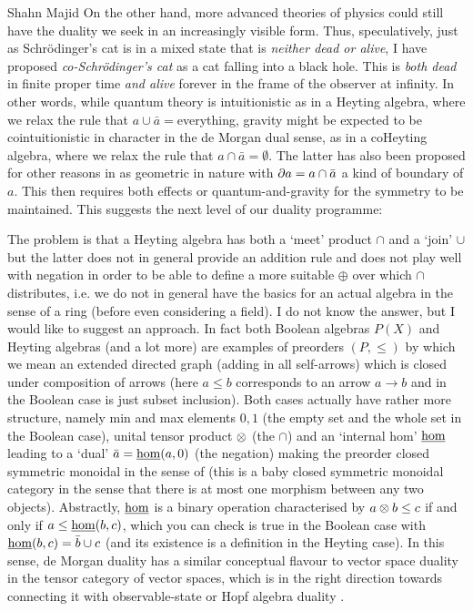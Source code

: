 \begin{artengenv}{Shahn Majid}
On the other hand, more advanced theories of physics could still have the duality we seek in an increasingly visible form. Thus, speculatively, just as Schr\"odinger's cat is in a mixed state that is {\em neither dead or alive}, I have proposed \parencite{Ma:qg3} {\em co-Schr\"odinger's cat} as a cat falling into a black hole. This is {\em both dead} in finite proper time {\em and alive} forever in the frame of the observer at infinity. In other words, while quantum theory is intuitionistic as in a Heyting algebra, where we relax the rule that $a\cup\bar a=$everything, gravity might be expected to be cointuitionistic in character in the de Morgan dual sense, as in a coHeyting algebra, where we relax the rule that $a\cap\bar a=\emptyset$. The latter has also been proposed for other reasons in \parencite{Law} as geometric in nature with ${\partial} a=a\cap \bar a$ a kind of boundary of $a$. This then requires both effects or quantum-and-gravity for the symmetry to be maintained. This suggests the next level of our duality programme: 


The problem is that a Heyting algebra has both a `meet' product $\cap$ and a `join' $\cup$ but the latter does not in general provide an addition rule and does not play well with negation in order to be able to define a more suitable $\oplus$ over which $\cap$ distributes, i.e. we do not in general have the basics for an actual algebra in the sense of a ring (before even considering a field). I do not know the answer, but I would like to suggest an approach. In fact both Boolean algebras $P(X)$ and Heyting algebras (and a lot more) are examples of preorders $(P,\le)$ by which we mean an extended directed graph (adding in all self-arrows) which is closed under composition of arrows (here $a\le b$ corresponds to an arrow $a\to b$ and in the Boolean case is just subset inclusion). Both cases actually have rather more structure, namely min and max elements $0,1$ (the empty set and the whole set in the Boolean case), unital tensor product $\otimes$ (the $\cap$) and an `internal hom' ${\underline{\rm hom}}$ leading to a `dual' $\bar a={\underline{\rm hom}}(a,0)$ (the negation) making the preorder closed symmetric monoidal in the sense of \parencite{ApCat} (this is a baby closed symmetric monoidal category in the sense that there is at most one morphism between any two objects). Abstractly, ${\underline{\rm hom}}$ is a binary operation characterised by
 $a\otimes b\le c$ if and only if $a\le {\underline{\rm hom}}(b,c)$, which you can check is true in the Boolean case with ${\underline{\rm hom}}(b,c)=\bar b\cup c$ (and its existence is a definition in the Heyting case). In this sense, de Morgan duality has a similar conceptual flavour to vector space duality in the tensor category of vector spaces, which is in the right direction towards connecting it with observable-state or Hopf algebra duality \parencite{Ma:sel}. 


\end{artengenv}
